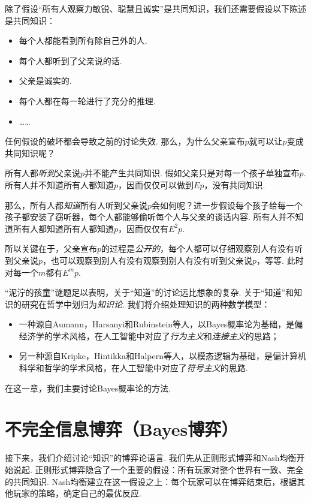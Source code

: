 除了假设“所有人观察力敏锐、聪慧且诚实”是共同知识，我们还需要假设以下陈述是共同知识：
    \begin{itemize}
        \item 每个人都能看到所有除自己外的人.
        \item 每个人都听到了父亲说的话.
        \item 父亲是诚实的.
        \item 每个人都在每一轮进行了充分的推理.
        \item ……
    \end{itemize}
任何假设的破坏都会导致之前的讨论失效. 那么，为什么父亲宣布$p$就可以让$p$变成共同知识呢？

所有人都\emph{听到}父亲说$p$并不能产生共同知识. 假如父亲只是对每一个孩子单独宣布$p$. 所有人并不知道所有人都知道$p$，因而仅仅可以做到$E p$，没有共同知识. 

那么，所有人都\emph{知道}所有人听到父亲说$p$会如何呢？进一步假设每个孩子给每一个孩子都安装了窃听器，每个人都能够偷听每个人与父亲的谈话内容. 所有人并不知道所有人都知道所有人都知道$p$，因而仅仅有$E^2 p$. 

所以关键在于，父亲宣布$p$的过程是\emph{公开的}，每个人都可以仔细观察别人有没有听到父亲说$p$，也可以观察到别人有没有观察到别人有没有听到父亲说$p$，等等. 此时对每一个$m$都有$E^m p$.

“泥泞的孩童”谜题足以表明，关于“知道”的讨论远比想象的复杂. 关于“知道”和知识的研究在哲学中划归为\emph{知识论}. 我们将介绍处理知识的两种数学模型：
\begin{itemize}
    \item 一种源自Aumann，Harsanyi和Rubinstein等人，以Bayes概率论为基础，是偏经济学的学术风格，在人工智能中对应了\emph{行为主义}和\emph{连接主义}的思路；
    \item 另一种源自Kripke，Hintikka和Halpern等人，以模态逻辑为基础，是偏计算机科学和哲学的学术风格，在人工智能中对应了\emph{符号主义}的思路. 
\end{itemize}
在这一章，我们主要讨论Bayes概率论的方法.

\section{不完全信息博弈（Bayes博弈）}

接下来，我们介绍讨论“知识”的博弈论语言. 我们先从正则形式博弈和Nash均衡开始说起. 正则形式博弈隐含了一个重要的假设：所有玩家对整个世界有一致、完全的共同知识. Nash均衡建立在这一假设之上：每个玩家可以在博弈结束后，根据其他玩家的策略，确定自己的最优反应. 


